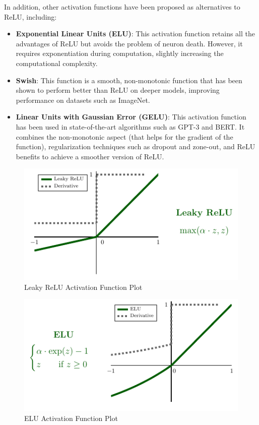 In addition, other activation functions have been proposed as alternatives to ReLU, including:
\begin{itemize}     
    \item \textbf{Exponential Linear Units (ELU)}: This activation function retains all the advantages of ReLU but avoids the problem of neuron death. However, it requires exponentiation during computation, slightly increasing the computational complexity.
    \item \textbf{Swish}: This function is a smooth, non-monotonic function that has been shown to perform better than ReLU on deeper models, improving performance on datasets such as ImageNet.
    \item \textbf{Linear Units with Gaussian Error (GELU)}: This activation function has been used in state-of-the-art algorithms such as GPT-3 and BERT. It combines the non-monotonic aspect (that helps for the gradient of the function),  regularization techniques such as dropout and zone-out, and ReLU benefits to achieve a smoother version of ReLU. 
\end{itemize}


\begin{figure}[!htbp]
    \centering
    \includegraphics[scale=2]{tikz/chapter1 - Leaky ReLU.pdf}
    \caption{Leaky ReLU Activation Function Plot}
\end{figure}

\begin{figure}[!htbp]
    \centering
    \includegraphics[scale=2]{tikz/chapter1 - ELU.pdf}
    \caption{ELU Activation Function Plot}
\end{figure}

